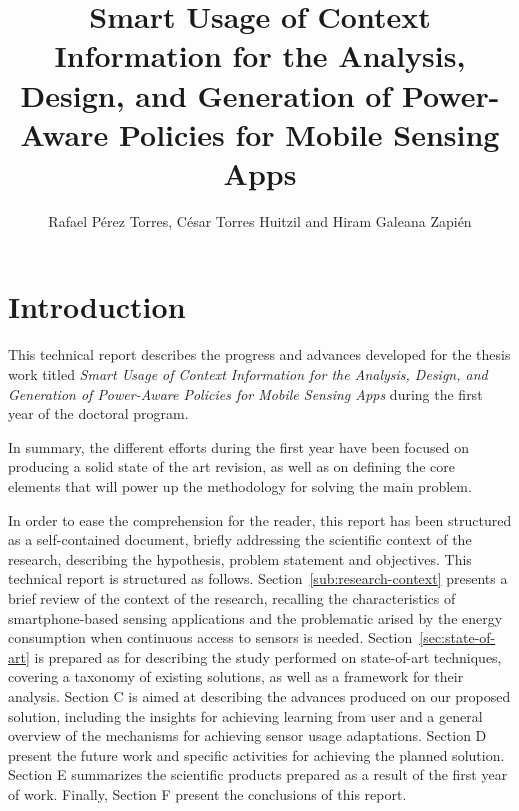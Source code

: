 \documentclass[ENG,PhD]{cinvestav}
\title{Smart Usage of Context Information for the Analysis, Design, and Generation of Power-Aware Policies for Mobile Sensing Apps}
\author{Rafael Pérez Torres, César Torres Huitzil and Hiram Galeana Zapién}
\begin{document}
\makeintropages



\section{Introduction}
\label{sec:introduction}
This technical report describes the progress and advances developed for the thesis work titled \emph{Smart Usage of Context Information for the Analysis, Design, and Generation of Power-Aware Policies for Mobile Sensing Apps} during the first year of the doctoral program.

In summary, the different efforts during the first year have been focused on producing a solid state of the art revision, as well as on defining the core elements that will power up the methodology for solving the main problem.

In order to ease the comprehension for the reader, this report has been structured as a self-contained document, briefly addressing the scientific context of the research, describing the hypothesis, problem statement and objectives.
This technical report is structured as follows.
Section~\ref{sub:research-context} presents a brief review of the context of the research, recalling the characteristics of smartphone-based sensing applications and the problematic arised by the energy consumption when continuous access to sensors is needed.
Section~\ref{sec:state-of-art} is prepared as for describing the study performed on state-of-art techniques, covering a taxonomy of existing solutions, as well as a framework for their analysis.
Section C is aimed at describing the advances produced on our proposed solution, including the insights for achieving learning from user and a general overview of the mechanisms for achieving sensor usage adaptations.
Section D present the future work and specific activities for achieving the planned solution.
Section E summarizes the scientific products prepared as a result of the first year of work.
Finally, Section F present the conclusions of this report.










\end{document}
